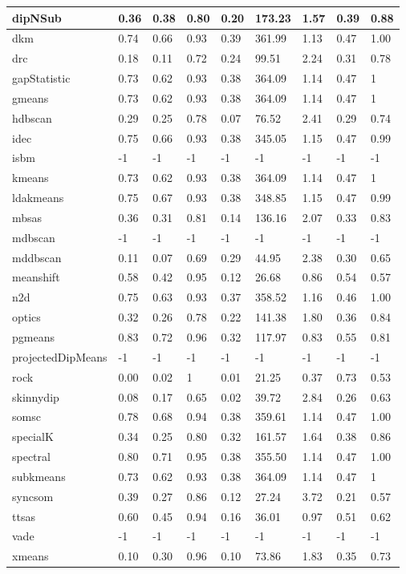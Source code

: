\begin{table}[H]
\begin{tabular}{|l|l|l|l|l|l|l|l|l|}
\hline
dipNSub & 0.36 & 0.38 & 0.80 & 0.20 & 173.23 & 1.57 & 0.39 & 0.88 \\
\hline
dkm & 0.74 & 0.66 & 0.93 & 0.39 & 361.99 & 1.13 & 0.47 & 1.00 \\
\hline
drc & 0.18 & 0.11 & 0.72 & 0.24 & 99.51 & 2.24 & 0.31 & 0.78 \\
\hline
gapStatistic & 0.73 & 0.62 & 0.93 & 0.38 & 364.09 & 1.14 & 0.47 & 1 \\
\hline
gmeans & 0.73 & 0.62 & 0.93 & 0.38 & 364.09 & 1.14 & 0.47 & 1 \\
\hline
hdbscan & 0.29 & 0.25 & 0.78 & 0.07 & 76.52 & 2.41 & 0.29 & 0.74 \\
\hline
idec & 0.75 & 0.66 & 0.93 & 0.38 & 345.05 & 1.15 & 0.47 & 0.99 \\
\hline
isbm & -1 & -1 & -1 & -1 & -1 & -1 & -1 & -1 \\
\hline
kmeans & 0.73 & 0.62 & 0.93 & 0.38 & 364.09 & 1.14 & 0.47 & 1 \\
\hline
ldakmeans & 0.75 & 0.67 & 0.93 & 0.38 & 348.85 & 1.15 & 0.47 & 0.99 \\
\hline
mbsas & 0.36 & 0.31 & 0.81 & 0.14 & 136.16 & 2.07 & 0.33 & 0.83 \\
\hline
mdbscan & -1 & -1 & -1 & -1 & -1 & -1 & -1 & -1 \\
\hline
mddbscan & 0.11 & 0.07 & 0.69 & 0.29 & 44.95 & 2.38 & 0.30 & 0.65 \\
\hline
meanshift & 0.58 & 0.42 & 0.95 & 0.12 & 26.68 & 0.86 & 0.54 & 0.57 \\
\hline
n2d & 0.75 & 0.63 & 0.93 & 0.37 & 358.52 & 1.16 & 0.46 & 1.00 \\
\hline
optics & 0.32 & 0.26 & 0.78 & 0.22 & 141.38 & 1.80 & 0.36 & 0.84 \\
\hline
pgmeans & 0.83 & 0.72 & 0.96 & 0.32 & 117.97 & 0.83 & 0.55 & 0.81 \\
\hline
projectedDipMeans & -1 & -1 & -1 & -1 & -1 & -1 & -1 & -1 \\
\hline
rock & 0.00 & 0.02 & 1 & 0.01 & 21.25 & 0.37 & 0.73 & 0.53 \\
\hline
skinnydip & 0.08 & 0.17 & 0.65 & 0.02 & 39.72 & 2.84 & 0.26 & 0.63 \\
\hline
somsc & 0.78 & 0.68 & 0.94 & 0.38 & 359.61 & 1.14 & 0.47 & 1.00 \\
\hline
specialK & 0.34 & 0.25 & 0.80 & 0.32 & 161.57 & 1.64 & 0.38 & 0.86 \\
\hline
spectral & 0.80 & 0.71 & 0.95 & 0.38 & 355.50 & 1.14 & 0.47 & 1.00 \\
\hline
subkmeans & 0.73 & 0.62 & 0.93 & 0.38 & 364.09 & 1.14 & 0.47 & 1 \\
\hline
syncsom & 0.39 & 0.27 & 0.86 & 0.12 & 27.24 & 3.72 & 0.21 & 0.57 \\
\hline
ttsas & 0.60 & 0.45 & 0.94 & 0.16 & 36.01 & 0.97 & 0.51 & 0.62 \\
\hline
vade & -1 & -1 & -1 & -1 & -1 & -1 & -1 & -1 \\
\hline
xmeans & 0.10 & 0.30 & 0.96 & 0.10 & 73.86 & 1.83 & 0.35 & 0.73 \\
\hline
\end{tabular}
\end{table}